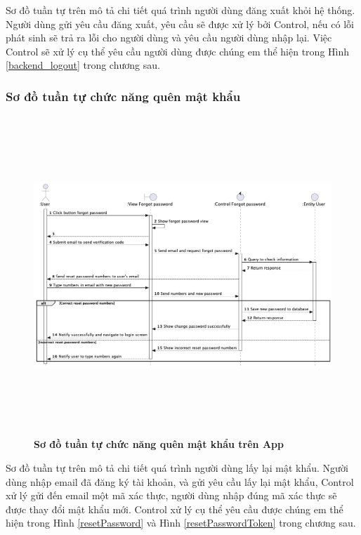 Sơ đồ tuần tự trên mô tả chi tiết quá trình người dùng đăng xuất khỏi hệ thống. Người dùng gửi yêu cầu đăng xuất, yêu cầu sẽ
được xử lý bởi Control, nếu có lỗi phát sinh sẽ trả ra lỗi cho người dùng và yêu cầu người dùng nhập lại. Việc Control
sẽ xử lý cụ thể yêu cầu người dùng được chúng em thể hiện trong Hình \ref{backend_logout} trong chương sau.


\subsubsection{Sơ đồ tuần tự chức năng quên mật khẩu}

  \begin{figure}[H]
        \centering
        \includegraphics[width=16cm,height=12cm]{Images/mobile_app/forgot_password.png}
        \caption[Sơ đồ tuần tự chức năng quên mật khẩu trên App]{\bfseries \fontsize{12pt}{0pt}
        \selectfont Sơ đồ tuần tự chức năng quên mật khẩu trên App}
        \label{forgot_password} %
  \end{figure}

  Sơ đồ tuần tự trên mô tả chi tiết quá trình người dùng lấy lại mật khẩu. Người dùng nhập email đã đăng ký tài khoản,
  và gửi yêu cầu lấy lại mật khẩu, Control xử lý gửi đến email một mã xác thực, người dùng nhập đúng mã xác thực sẽ được thay
  đổi mật khẩu mới. Control xử lý cụ thể yêu cầu được chúng em thể hiện trong Hình \ref{resetPassword} và Hình \ref{resetPasswordToken} trong chương sau.

